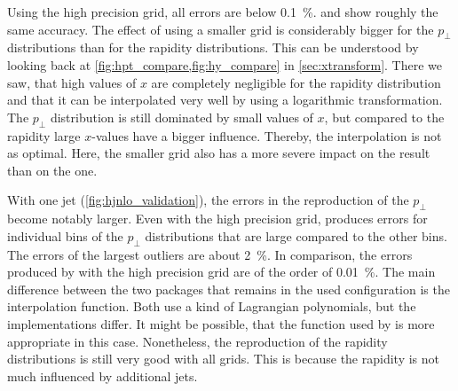 %
Using the high precision grid, all errors are below \SI{0.1}{\percent}.
\appl{} and \fnlo{} show roughly the same accuracy.
The effect of using a smaller grid is considerably bigger for the $p_\perp$ distributions than for the rapidity distributions.
This can be understood by looking back at \cref{fig:hpt_compare,fig:hy_compare} in \cref{sec:xtransform}.
There we saw, that high values of $x$ are completely negligible for the rapidity distribution and that it can be interpolated very well by using a logarithmic transformation.
The $p_\perp$ distribution is still dominated by small values of $x$, but compared to the rapidity large $x$-values have a bigger influence.
Thereby, the interpolation is not as optimal.
Here, the smaller grid also has a more severe impact on the \appl{} result than on the \fnlo{} one.

With one jet (\cref{fig:hjnlo_validation}), the errors in the reproduction of the $p_\perp$ become notably larger.
Even with the high precision grid, \fnlo{} produces errors for individual bins of the $p_\perp$ distributions that are large compared to the other bins.
The errors of the largest outliers are about \SI{2}{\percent}.
In comparison, the errors produced by \appl{} with the high precision grid are of the order of \SI{0.01}{\percent}.
The main difference between the two packages that remains in the used configuration is the interpolation function.
Both use a kind of Lagrangian polynomials, but the implementations differ.
It might be possible, that the function used by \appl{} is more appropriate in this case.
Nonetheless, the reproduction of the rapidity distributions is still very good with all grids.
This is because the rapidity is not much influenced by additional jets.
%
